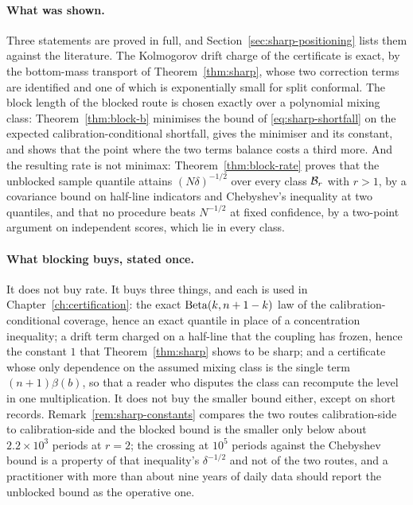 \documentclass[../../../main.tex]{subfiles}
\begin{document}
\paragraph{What was shown.} Three statements are proved in full, and Section~\ref{sec:sharp-positioning} lists them against the literature. The Kolmogorov drift charge of the certificate is exact, by the bottom-mass transport of Theorem~\ref{thm:sharp}, whose two correction terms are identified and one of which is exponentially small for split conformal. The block length of the blocked route is chosen exactly over a polynomial mixing class: Theorem~\ref{thm:block-b} minimises the bound of \eqref{eq:sharp-shortfall} on the expected calibration-conditional shortfall, gives the minimiser and its constant, and shows that the point where the two terms balance costs a third more. And the resulting rate is not minimax: Theorem~\ref{thm:block-rate} proves that the unblocked sample quantile attains $(N\delta)^{-1/2}$ over every class $\mathcal B_{r}$ with $r>1$, by a covariance bound on half-line indicators and Chebyshev's inequality at two quantiles, and that no procedure beats $N^{-1/2}$ at fixed confidence, by a two-point argument on independent scores, which lie in every class.

\paragraph{What blocking buys, stated once.} It does not buy rate. It buys three things, and each is used in Chapter~\ref{ch:certification}: the exact $\operatorname{Beta}(k,n+1-k)$ law of the calibration-conditional coverage, hence an exact quantile in place of a concentration inequality; a drift term charged on a half-line that the coupling has frozen, hence the constant $1$ that Theorem~\ref{thm:sharp} shows to be sharp; and a certificate whose only dependence on the assumed mixing class is the single term $(n+1)\beta(b)$, so that a reader who disputes the class can recompute the level in one multiplication. It does not buy the smaller bound either, except on short records. Remark~\ref{rem:sharp-constants} compares the two routes calibration-side to calibration-side and the blocked bound is the smaller only below about $2.2\times10^3$ periods at $r=2$; the crossing at $10^5$ periods against the Chebyshev bound is a property of that inequality's $\delta^{-1/2}$ and not of the two routes, and a practitioner with more than about nine years of daily data should report the unblocked bound as the operative one.
\end{document}
